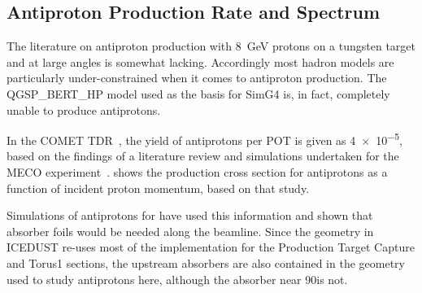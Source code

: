 \subsection{Antiproton Production Rate and Spectrum}
The literature on antiproton production with 8~GeV protons on a tungsten target and at large angles is somewhat lacking.
Accordingly most hadron models are particularly under-constrained when it comes to antiproton production.
The QGSP_BERT_HP model used as the basis for SimG4 is, in fact, completely unable to produce antiprotons.

\FigAntiprotonMeco
In the COMET TDR~\cite{TDR2016}, the yield of antiprotons per \ac{POT} is given as \num{4e-5}, based on the findings of a literature review and simulations undertaken for the MECO experiment~\cite{Meco024}.
 shows the production cross section for antiprotons as a function of incident proton momentum, based on that study.

Simulations of antiprotons for \phaseI have used this information and shown that absorber foils would be needed along the beamline.  
Since the \phaseII geometry in ICEDUST re-uses most of the implementation for the Production Target Capture and Torus1 sections, the upstream absorbers are also contained in the geometry used to study antiprotons here,
although the absorber near 90\degree is not.

